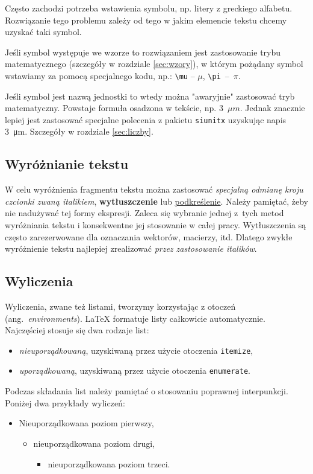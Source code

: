 Często zachodzi potrzeba wstawienia symbolu, np. litery z greckiego alfabetu. Rozwiązanie tego problemu zależy od tego w jakim elemencie tekstu chcemy uzyskać taki symbol. 

Jeśli symbol występuje we wzorze to rozwiązaniem jest zastosowanie trybu matematycznego  (szczegóły w rozdziale \ref{sec:wzory}), w którym pożądany symbol wstawiamy za pomocą specjalnego kodu, np.: \texttt{\textbackslash mu} -- $\mu $, \texttt{\textbackslash pi}~--~$\pi$.

Jeśli symbol jest nazwą jednostki to wtedy można "awaryjnie" zastosować tryb matematyczny. Powstaje formuła osadzona w tekście, np. 3~$\mu m$. Jednak znacznie lepiej jest zastosować specjalne polecenia z pakietu \texttt{siunitx} uzyskując napis \SI{3}{\micro\meter}. Szczegóły w rozdziale \ref{sec:liczby}.

\subsection{Wyróżnianie tekstu}
W celu wyróżnienia fragmentu tekstu można zastosować \textit{specjalną odmianę  kroju czcionki zwaną italikiem}, \textbf{wytłuszczenie}  lub  \underline{podkreślenie}. Należy pamiętać, żeby nie nadużywać tej formy ekspresji. Zaleca się wybranie jednej z~tych metod wyróżniania tekstu i  konsekwentne jej stosowanie w całej pracy. Wytłuszczenia są często zarezerwowane dla oznaczania wektorów, macierzy, itd. Dlatego zwykłe wyróżnienie tekstu najlepiej zrealizować   \textit{przez zastosowanie italików}. 




\subsection{Wyliczenia}
Wyliczenia, zwane też listami, tworzymy korzystając  z otoczeń (ang.~\textit{environments}). {\LaTeX}  formatuje listy całkowicie automatycznie.  Najczęściej stosuje się dwa rodzaje list:
\begin{itemize}
\item \textit{nieuporządkowaną}, uzyskiwaną przez użycie otoczenia \texttt{itemize},
\item \textit{uporządkowaną}, uzyskiwaną przez użycie otoczenia \texttt{enumerate}.
\end{itemize}
Podczas składania list należy pamiętać o stosowaniu poprawnej interpunkcji. Poniżej dwa przykłady wyliczeń:
\begin{itemize}
\item Nieuporządkowana poziom pierwszy, 
\begin{itemize}
\item nieuporządkowana poziom drugi,
\begin{itemize}
\item nieuporządkowana poziom trzeci.
\end{itemize}
\end{itemize}
\end{itemize}


